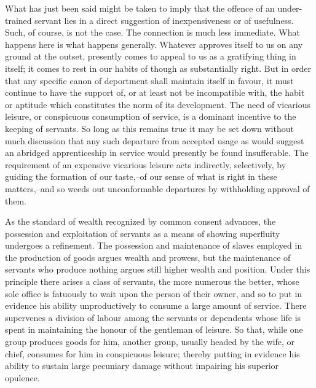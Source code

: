 \documentclass[12pt]{report}
\begin{document}
What has just been said might be taken to imply that the offence of an
under-trained servant lies in a direct suggestion of inexpensiveness or
of usefulness. Such, of course, is not the case. The connection is much
less immediate. What happens here is what happens generally. Whatever
approves itself to us on any ground at the outset, presently comes to
appeal to us as a gratifying thing in itself; it comes to rest in our
habits of though as substantially right. But in order that any specific
canon of deportment shall maintain itself in favour, it must continue to
have the support of, or at least not be incompatible with, the habit
or aptitude which constitutes the norm of its development. The need of
vicarious leisure, or conspicuous consumption of service, is a dominant
incentive to the keeping of servants. So long as this remains true it
may be set down without much discussion that any such departure from
accepted usage as would suggest an abridged apprenticeship in service
would presently be found insufferable. The requirement of an expensive
vicarious leisure acts indirectly, selectively, by guiding the formation
of our taste,--of our sense of what is right in these matters,--and so
weeds out unconformable departures by withholding approval of them.

As the standard of wealth recognized by common consent advances,
the possession and exploitation of servants as a means of showing
superfluity undergoes a refinement. The possession and maintenance of
slaves employed in the production of goods argues wealth and prowess,
but the maintenance of servants who produce nothing argues still higher
wealth and position. Under this principle there arises a class of
servants, the more numerous the better, whose sole office is fatuously
to wait upon the person of their owner, and so to put in evidence his
ability unproductively to consume a large amount of service. There
supervenes a division of labour among the servants or dependents whose
life is spent in maintaining the honour of the gentleman of leisure.
So that, while one group produces goods for him, another group, usually
headed by the wife, or chief, consumes for him in conspicuous leisure;
thereby putting in evidence his ability to sustain large pecuniary
damage without impairing his superior opulence.
\end{document}
